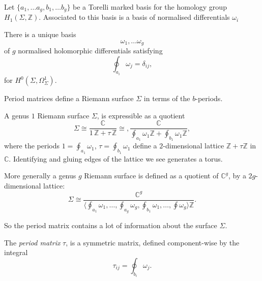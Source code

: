     Let \( \{ a_1, \dots a_g, b_1, \dots b_g\}\) be a Torelli marked basis for the homology group \(H_1(\Sigma, \mathbb{Z})\).  Associated to this basis is a basis of normalised differentials \( \omega_i\)
    \begin{defn}
    \label{defn:normaliseddiffs}
    There is a unique basis 
    \[ \omega_1, \dots \omega_g  \]
    of \(g\) normalised holomorphic differentials satisfying
    \[ \oint_{a_i} \omega_j = \delta_{ij},\]
    for \( H^0(\Sigma, \Omega_\Sigma^1)\). 
    \end{defn}
    Period matrices define a Riemann surface \( \Sigma\) in terms of the \(b\)-periods. 
    \begin{ex} A genus \(1\) Riemann surface \( \Sigma\), is expressible as a quotient 
    \[ \Sigma \cong \frac{\mathbb{C}}{1 \, \mathbb{Z} + \tau \, \mathbb{Z}} \cong ,\frac{\mathbb{C}}{\oint_{a_1} \omega_1 \mathbb{Z} +  \oint_{b_1} \omega_1 \mathbb{Z}},\]
    where the periods \( 1 = \oint_{a_1} \omega_1\), \(\tau = \oint_{b_1} \omega_1 \) define a \(2\)-dimensional lattice \( \mathbb{Z} + \tau \mathbb{Z}\) in \( \mathbb{C}\). Identifying and gluing edges of the lattice we see generates a torus.
    
    More generally a genus \(g\) Riemann surface is defined as a quotient of \( \mathbb{C}^{g}\), by a \(2 g \)-dimensional lattice:
    \[ \Sigma \cong \frac{\mathbb{C}^g}{ \langle \oint_{a_1} \omega_1, \dots, \oint_{a_g} \omega_g, \oint_{b_1} \omega_1, \dots, \oint \omega_g \rangle \mathbb{Z} }.\]
    \end{ex} 
    
    So the period matrix contains a lot of information about the surface \( \Sigma\).  

    \begin{defn}
    \label{defn:periodmat}
    The \emph{period matrix} \( \tau\), is a symmetric matrix, defined component-wise by the integral
    \[ \tau_{ij} = \oint_{b_i} \omega_j. \]
    \end{defn}
    
